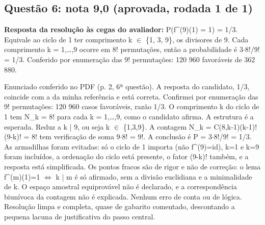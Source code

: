 \documentclass{article}%
\begin{document}
\subsection*{Questão 6: nota 9,0 (aprovada, rodada 1 de 1)}%
\textbf{Resposta da resolução às cegas do avaliador:} P(f\^{}(9)(1) = 1) = 1/3. Equivale ao ciclo de 1 ter comprimento k $\in$ \{1, 3, 9\}, os divisores de 9. Cada comprimento k = 1,\ldots{},9 ocorre em 8! permutações, então a probabilidade é 3$\cdot$8!/9! = 1/3. Conferido por enumeração das 9! permutações: 120 960 favoráveis de 362 880.\par %
Enunciado conferido no PDF (p. 2, 6ª questão). A resposta do candidato, 1/3, coincide com a da minha referência e está correta. Confirmei por enumeração das 9! permutações: 120 960 casos favoráveis, razão 1/3. O comprimento k do ciclo de 1 tem N\_k = 8! para cada k = 1,\ldots{},9, como o candidato afirma. A estrutura é a esperada. Reduz a k | 9, ou seja k $\in$ \{1,3,9\}. A contagem N\_k = C(8,k-1)(k-1)!(9-k)! = 8! tem verificação de soma 9$\cdot$8! = 9!. A conclusão é P = 3$\cdot$8!/9! = 1/3. As armadilhas foram evitadas: só o ciclo de 1 importa (não f\^{}(9)=id), k=1 e k=9 foram incluídos, a ordenação do ciclo está presente, o fator (9-k)! também, e a resposta está simplificada. Os pontos fracos são de rigor e não de correção: o lema f\^{}(m)(1)=1 $\Leftrightarrow$ k | m é só afirmado, sem a divisão euclidiana e a minimalidade de k. O espaço amostral equiprovável não é declarado, e a correspondência biunívoca da contagem não é explicada. Nenhum erro de conta ou de lógica. Resolução limpa e completa, quase de gabarito comentado, descontando a pequena lacuna de justificativa do passo central.%
\end{document}
